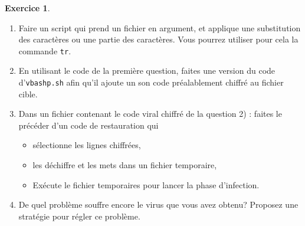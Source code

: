 \documentclass[a4paper,11pt]{article}
\theoremstyle{plain}
\theoremstyle{definition}
\newtheorem{exercice}{Exercice}
\begin{document}
\begin{exercice}

\begin{enumerate}
\item Faire un script qui prend un fichier en argument, et applique une substitution des caractères ou une partie des caractères.
Vous pourrez utiliser pour cela la commande \texttt{tr}.
\item En utilisant le code de la première question, faites une version du code d'\texttt{vbashp.sh} afin qu'il ajoute un son code préalablement chiffré au  fichier cible.
\item Dans un fichier contenant le code viral chiffré de la question 2) : faites le précéder d'un code de restauration qui 
\begin{itemize}
\item sélectionne les lignes chiffrées, 
\item les déchiffre et les mets dans un fichier temporaire,
\item Exécute le fichier temporaires pour lancer la phase d'infection.
\end{itemize}
\item De quel problème souffre encore le virus que vous avez obtenu? Proposez une stratégie pour régler ce problème.
\end{enumerate}

\end{exercice}
\end{document}

